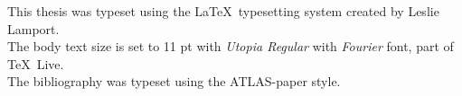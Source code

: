 \pagestyle{empty}
\hfill

\vfill

\begin{flushright}
	This thesis was typeset using the \LaTeX\ typesetting system created by Leslie Lamport.\\
	The body text size is set to 11 pt with \emph{Utopia Regular} with \emph{Fourier} font, part of \TeX\ Live.\\
	The bibliography was typeset using the \ac{ATLAS}-paper style.
\end{flushright}